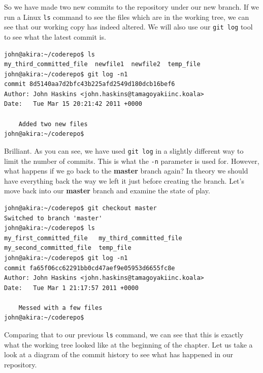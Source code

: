 So we have made two new commits to the repository under our new branch.  If we run a Linux \texttt{ls} command to see the files which are in the working tree, we can see that our working copy has indeed altered.  We will also use our \texttt{git log} tool to see what the latest commit is.

\begin{Verbatim}[frame=leftline,framerule=1mm,fontsize=\relsize{-3}] 
john@akira:~/coderepo$ ls
my_third_committed_file  newfile1  newfile2  temp_file
john@akira:~/coderepo$ git log -n1
commit 8d5140aa7d2bfc43b225afd2549d180dcb16bef6
Author: John Haskins <john.haskins@tamagoyakiinc.koala>
Date:   Tue Mar 15 20:21:42 2011 +0000

    Added two new files
john@akira:~/coderepo$ 
\end{Verbatim}

Brilliant.  As you can see, we have used \texttt{git log} in a slightly different way to limit the number of commits.  This is what the \texttt{-n} parameter is used for.  However, what happens if we go back to the \textbf{master} branch again?  In theory we should have everything back the way we left it just before creating the branch.  Let's move back into our \textbf{master} branch and examine the state of play.

\begin{Verbatim}[frame=leftline,framerule=1mm,fontsize=\relsize{-3}] 
john@akira:~/coderepo$ git checkout master
Switched to branch 'master'
john@akira:~/coderepo$ ls 
my_first_committed_file   my_third_committed_file
my_second_committed_file  temp_file
john@akira:~/coderepo$ git log -n1
commit fa65f06cc62291bb0cd47aef9e05953d6655fc8e
Author: John Haskins <john.haskins@tamagoyakiinc.koala>
Date:   Tue Mar 1 21:17:57 2011 +0000

    Messed with a few files
john@akira:~/coderepo$ 
\end{Verbatim}

Comparing that to our previous \texttt{ls} command, we can see that this is exactly what the working tree looked like at the beginning of the chapter.  Let us take a look at a diagram of the commit history to see what has happened in our repository.

